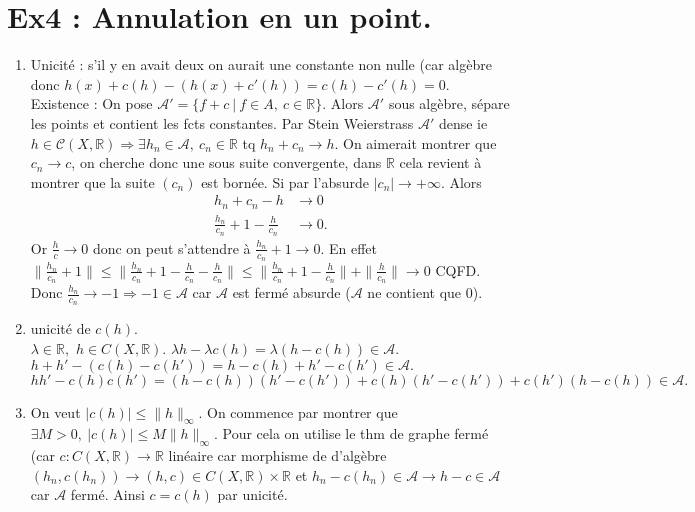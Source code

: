 \documentclass[a4paper]{article}
\begin{document}
\section*{Ex4 : Annulation en un point.}
\begin{enumerate}
    \item Unicité : s'il y en avait deux on aurait une constante non nulle (car algèbre donc $h(x)+c(h) - (h(x)+c'(h)) = c(h)-c'(h) = 0$.\\
        Existence : On pose $\mathcal{A}'=\{f+c\ |\ f\in A,\ c\in \mathbb{R} \} .$ Alors $\mathcal{A}'$ sous algèbre,  sépare les points et contient les fcts constantes. Par Stein Weierstrass $\mathcal{A}'$ dense ie $h\in \mathcal{C}(X,\mathbb{R} )\Rightarrow \exists h_n\in \mathcal{A},\ c_n\in \mathbb{R} $ tq $h_n+c_n\to h.$ On aimerait montrer que $c_n\to c$, on cherche donc une sous suite convergente, dans $\mathbb{R} $ cela revient à montrer que la suite $(c_n)$ est bornée. Si par l'absurde $|c_n|\to +\infty $. Alors
        \begin{align*}
            h_n+c_n-h &\to 0\\
            \frac{h_n}{c_n}+1-\frac{h}{c_n}&\to 0
        .\end{align*}
        Or $\frac{h}{c}\to 0$ donc on peut s'attendre à $\frac{h_n}{c_n}+1\to 0$. En effet $\|\frac{h_n}{c_n}+1\|\le \|\frac{h_n}{c_n}+1-\frac{h}{c_n}-\frac{h}{c_n}\|\le \|\frac{h_n}{c_n}+1-\frac{h}{c_n}\|+\|\frac{h}{c_n}\|\to 0$ CQFD. Donc $\frac{h_n}{c_n}\to -1\Rightarrow -1\in \mathcal{A}$ car $\mathcal{A}$ est fermé absurde ($\mathcal{A}$ ne contient que 0).

    \item unicité de $c(h).$ \\
        $\lambda\in \mathbb{R} ,$ $h\in C(X,\mathbb{R} ).$ $\lambda h-\lambda c(h)=\lambda(h-c(h))\in \mathcal{A}.$\\
        $h+h'-\left( c(h)-c(h') \right) =h-c(h)+h'-c(h')\in \mathcal{A}.$ \\
        $hh'-c(h)c(h')=\left( h-c(h) \right) \left( h'-c(h') \right) +c(h)\left( h'-c(h') \right) +c(h')\left( h-c(h) \right) \in \mathcal{A}.$
        \item On veut $|c(h)| \le \|h\|_\infty $. On commence par montrer que $\exists M>0,\ |c(h)| \le M\|h\|_\infty .$ Pour cela on utilise le thm de graphe fermé (car $c:C(X,\mathbb{R} )\to \mathbb{R} $ linéaire car morphisme de d'algèbre $(h_n,c(h_n))\to (h,c)\in C(X,\mathbb{R} )\times \mathbb{R} $  et $h_n-c(h_n)\in \mathcal{A}\to h-c\in \mathcal{A}$ car $\mathcal{A}$ fermé. Ainsi $c=c(h)$ par unicité.


\end{enumerate}
\end{document}

